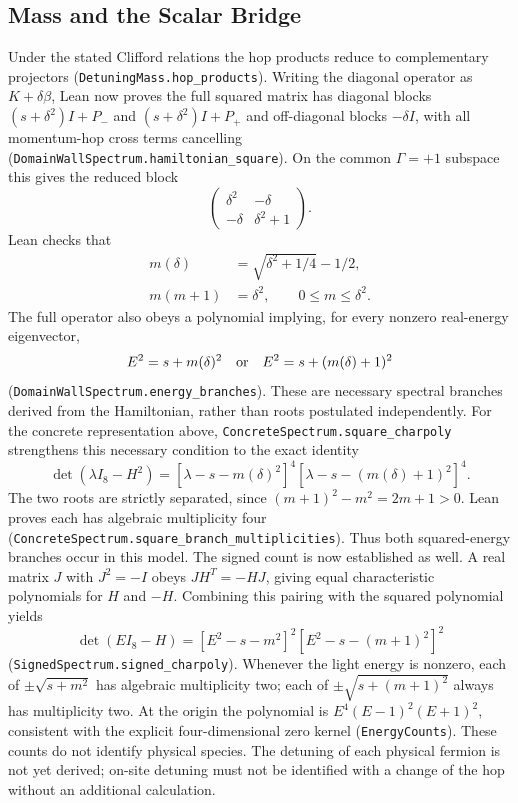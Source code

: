 \subsection{Mass and the Scalar Bridge}
\label{sec:capacity_mechanism}
Under the stated Clifford relations the hop products reduce to complementary projectors (\nolinkurl{DetuningMass.hop_products}). Writing the diagonal operator as $K+\delta\beta$, Lean now proves the full squared matrix has diagonal blocks $(s+\delta^2)I+P_-$ and $(s+\delta^2)I+P_+$ and off-diagonal blocks $-\delta I$, with all momentum-hop cross terms cancelling (\nolinkurl{DomainWallSpectrum.hamiltonian_square}). On the common $\Gamma=+1$ subspace this gives the reduced block
\begin{equation}
 \begin{pmatrix}\delta^2&-\delta\\-\delta&\delta^2+1\end{pmatrix}.
\end{equation}
Lean checks that
\begin{equation}
 \begin{aligned}
 m(\delta)&=\sqrt{\delta^2+1/4}-1/2,\\
 m(m+1)&=\delta^2,\qquad 0\leq m\leq\delta^2.
 \end{aligned}
\end{equation}
The full operator also obeys a polynomial implying, for every nonzero real-energy eigenvector,
\begin{equation}
 E^2=s+m(\delta)^2\quad\hbox{or}\quad E^2=s+(m(\delta)+1)^2
\end{equation}
(\nolinkurl{DomainWallSpectrum.energy_branches}). These are necessary spectral branches derived from the Hamiltonian, rather than roots postulated independently. For the concrete representation above, \nolinkurl{ConcreteSpectrum.square_charpoly} strengthens this necessary condition to the exact identity
\begin{equation}
 \det(\lambda I_8-H^2)=
 [\lambda-s-m(\delta)^2]^4
 [\lambda-s-(m(\delta)+1)^2]^4.
\end{equation}
The two roots are strictly separated, since $(m+1)^2-m^2=2m+1>0$. Lean proves each has algebraic multiplicity four (\nolinkurl{ConcreteSpectrum.square_branch_multiplicities}). Thus both squared-energy branches occur in this model. The signed count is now established as well. A real matrix $J$ with $J^2=-I$ obeys $JH^T=-HJ$, giving equal characteristic polynomials for $H$ and $-H$. Combining this pairing with the squared polynomial yields
\begin{equation}
 \det(E I_8-H)=[E^2-s-m^2]^2[E^2-s-(m+1)^2]^2
\end{equation}
(\nolinkurl{SignedSpectrum.signed_charpoly}). Whenever the light energy is nonzero, each of $\pm\sqrt{s+m^2}$ has algebraic multiplicity two; each of $\pm\sqrt{s+(m+1)^2}$ always has multiplicity two. At the origin the polynomial is $E^4(E-1)^2(E+1)^2$, consistent with the explicit four-dimensional zero kernel (\nolinkurl{EnergyCounts}). These counts do not identify physical species. The detuning of each physical fermion is not yet derived; on-site detuning must not be identified with a change of the hop without an additional calculation.


